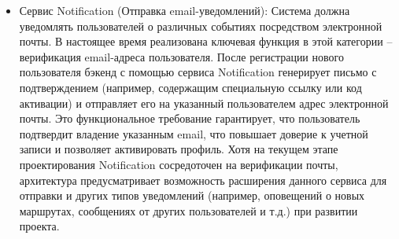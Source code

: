 \begin{itemize}
    \item Сервис Notification (Отправка email-уведомлений): Система должна уведомлять пользователей о различных событиях посредством электронной почты. В настоящее время реализована ключевая функция в этой категории – верификация email-адреса пользователя. После регистрации нового пользователя бэкенд с помощью сервиса Notification генерирует письмо с подтверждением (например, содержащим специальную ссылку или код активации) и отправляет его на указанный пользователем адрес электронной почты. Это функциональное требование гарантирует, что пользователь подтвердит владение указанным email, что повышает доверие к учетной записи и позволяет активировать профиль. Хотя на текущем этапе проектирования Notification сосредоточен на верификации почты, архитектура предусматривает возможность расширения данного сервиса для отправки и других типов уведомлений (например, оповещений о новых маршрутах, сообщениях от других пользователей и т.д.) при развитии проекта.
\end{itemize}

